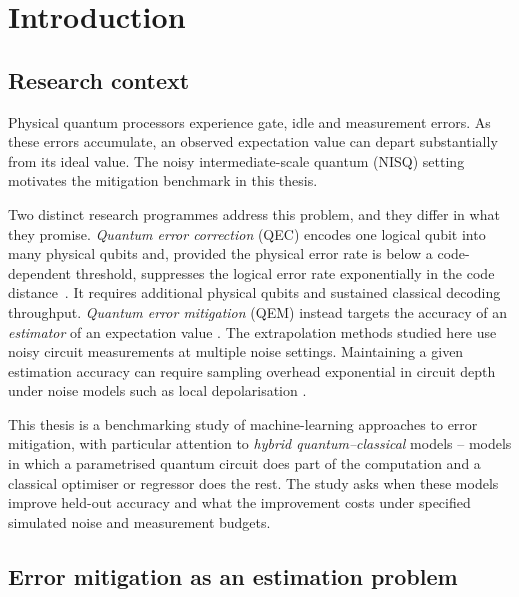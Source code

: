 \documentclass[Thesis.tex]{subfiles}
\begin{document}
\setcounter{chapter}{0} %



\chapter{Introduction}\label{chap1:introduction}

\section{Research context}

Physical quantum processors experience gate, idle and measurement errors. As
these errors accumulate, an observed expectation value can depart substantially
from its ideal value. The noisy intermediate-scale quantum (NISQ)
setting~\cite{preskill2018nisq,bharti2022noisy} motivates the mitigation benchmark
in this thesis.

Two distinct research programmes address this problem, and they differ in what they
promise. \emph{Quantum error correction} (QEC) encodes one logical qubit into many
physical qubits and, provided the physical error rate is below a code-dependent
threshold, suppresses the logical error rate exponentially in the code
distance~\cite{dennis2002topological,fowler2012surface,google2025below}. It
requires additional physical qubits and sustained classical decoding throughput.
\emph{Quantum error mitigation} (QEM) instead targets the accuracy of an
\emph{estimator} of an expectation value
\cite{temme2017error,li2017efficient,cai2023review}. The extrapolation methods
studied here use noisy circuit measurements at multiple noise settings.
Maintaining a given estimation accuracy can require sampling overhead
exponential in circuit depth under noise models such as local depolarisation
\cite{takagi2022fundamental,quek2024exponentially}.

This thesis is a benchmarking study of machine-learning approaches to error mitigation,
with particular attention to \emph{hybrid quantum--classical} models -- models in
which a parametrised quantum circuit does part of the computation and a classical
optimiser or regressor does the rest. The study asks when these models improve
held-out accuracy and what the improvement costs under specified simulated
noise and measurement budgets.

\section{Error mitigation as an estimation problem}
\end{document}
